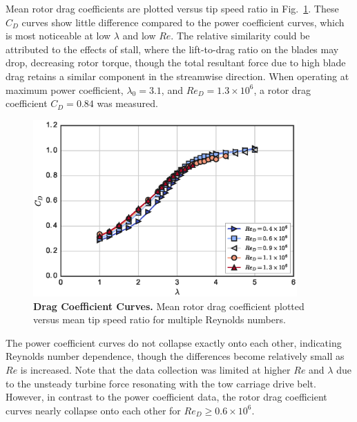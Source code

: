 \documentclass[10pt,letterpaper]{article}
\begin{document}
Mean rotor drag coefficients are plotted versus tip speed ratio in
Fig.~\ref{fig:cd-curves}. These $C_D$ curves show little difference compared to
the power coefficient curves, which is most noticeable at low $\lambda$ and low
$Re$. The relative similarity could be attributed to the effects of stall, where
the lift-to-drag ratio on the blades may drop, decreasing rotor torque, though
the total resultant force due to high blade drag retains a similar component in
the streamwise direction. When operating at maximum power coefficient,
$\lambda_0=3.1$, and $Re_D=1.3 \times 10^6$, a rotor drag coefficient $C_D=0.84$
was measured.

\begin{figure}
    \includegraphics[width=0.9\textwidth]{figures/cd_curves.eps}

    \caption{{\bf Drag Coefficient Curves.} Mean rotor drag coefficient plotted
    versus mean tip speed ratio for multiple Reynolds numbers.}

    \label{fig:cd-curves}
\end{figure}

The power coefficient curves do not collapse exactly onto each other, indicating
Reynolds number dependence, though the differences become relatively small as
$Re$ is increased. Note that the data collection was limited at higher $Re$ and
$\lambda$ due to the unsteady turbine force resonating with the tow carriage
drive belt. However, in contrast to the power coefficient data, the rotor drag
coefficient curves nearly collapse onto each other for $Re_D \ge 0.6 \times
10^6$.
\end{document}
